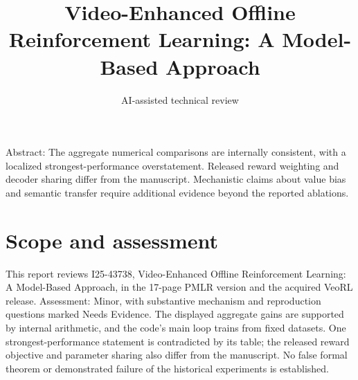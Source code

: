 \documentclass[10pt]{article}
\title{Video-Enhanced Offline Reinforcement Learning: A Model-Based Approach}
\author{AI-assisted technical review}
\date{}
\begin{document}
\maketitle
Abstract: The aggregate numerical comparisons are internally consistent, with a localized strongest-performance overstatement. Released reward weighting and decoder sharing differ from the manuscript. Mechanistic claims about value bias and semantic transfer require additional evidence beyond the reported ablations.\par
\section*{Scope and assessment}
This report reviews I25-43738, Video-Enhanced Offline Reinforcement Learning: A Model-Based Approach, in the 17-page PMLR version and the acquired VeoRL release. Assessment: Minor, with substantive mechanism and reproduction questions marked Needs Evidence. The displayed aggregate gains are supported by internal arithmetic, and the code’s main loop trains from fixed datasets. One strongest-performance statement is contradicted by its table; the released reward objective and parameter sharing also differ from the manuscript. No false formal theorem or demonstrated failure of the historical experiments is established.\par
\end{document}
